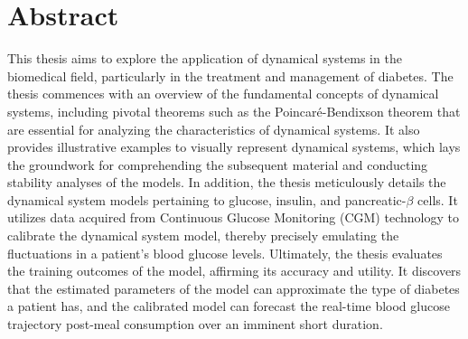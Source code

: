 \chapter*{Abstract}%

This thesis aims to explore the application of dynamical systems in the biomedical field, particularly in the treatment and management of diabetes.  The thesis commences with an overview of the fundamental concepts of dynamical systems, including pivotal theorems such as the Poincaré-Bendixson theorem that are essential for analyzing the characteristics of dynamical systems. It also provides illustrative examples to visually represent dynamical systems, which lays the groundwork for comprehending the subsequent material and conducting stability analyses of the models. In addition, the thesis meticulously details the dynamical system models pertaining to glucose, insulin, and pancreatic-$\beta$
cells. It utilizes data acquired from Continuous Glucose Monitoring (CGM) technology to calibrate the dynamical system model, thereby precisely emulating the fluctuations in a patient's blood glucose levels. Ultimately, the thesis evaluates the training outcomes of the model, affirming its accuracy and utility. It discovers that the estimated parameters of the model can approximate the type of diabetes a patient has, and the calibrated model can forecast the real-time blood glucose trajectory post-meal consumption over an imminent short duration.

